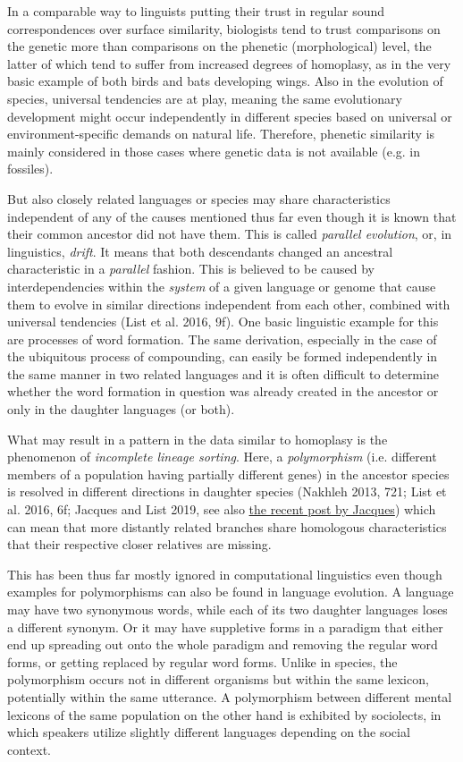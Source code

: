 \documentclass[
  a4paper,
  14pt,
  oneside,
  tablecaptionabove
]{scrbook}
\begin{document}
In a comparable way to linguists putting their trust in regular sound correspondences over surface similarity, biologists tend to trust comparisons on the genetic more than comparisons on the phenetic (morphological) level, the latter of which tend to suffer from increased degrees of homoplasy, as in the very basic example of both birds and bats developing wings. Also in the evolution of species, universal tendencies are at play, meaning the same evolutionary development might occur independently in different species based on universal or environment-specific demands on natural life. Therefore, phenetic similarity is mainly considered in those cases where genetic data is not available (e.g. in fossiles).

But also closely related languages or species may share characteristics independent of any of the
causes mentioned thus far even though it is known that their common ancestor did not have them.
This is called \emph{parallel evolution}, or, in linguistics, \emph{drift}. It means that both descendants
changed an ancestral characteristic in a \emph{parallel} fashion. This is believed to be
caused by interdependencies within the \emph{system} of a given language or genome that cause them to evolve in similar directions independent from each other, combined with universal tendencies (List et al. 2016, 9f). One basic linguistic example for this are processes of word formation. The same derivation, especially in the case of the ubiquitous process of compounding, can easily be formed independently in the same manner in two related languages and it is often difficult to determine whether the word formation in question was already created in the ancestor or only in the daughter languages (or both).

What may result in a pattern in the data similar to homoplasy is the phenomenon of
\emph{incomplete lineage sorting}. Here, a \emph{polymorphism} (i.e. different members of a population having partially different genes) in the ancestor species is resolved in different directions in daughter species (Nakhleh 2013, 721; List et al. 2016, 6f; Jacques and List 2019, see also
\href{https://panchr.hypotheses.org/3025}{the recent post by Jacques}) which can mean that more distantly related branches share homologous characteristics that their respective closer relatives are missing.

This has been thus far mostly ignored in computational linguistics even though examples for polymorphisms can also be found in language evolution. A language may have two synonymous words, while each of its two daughter languages loses a different synonym. Or it may have suppletive forms in a paradigm that either end up spreading out onto the whole paradigm and removing the regular word forms, or getting replaced by regular word forms. Unlike in species, the polymorphism occurs not in different organisms but within the same lexicon, potentially within the same utterance. A polymorphism between different mental lexicons of the same population on the other hand is exhibited by sociolects, in which speakers utilize slightly different languages depending on the social context.
\end{document}
